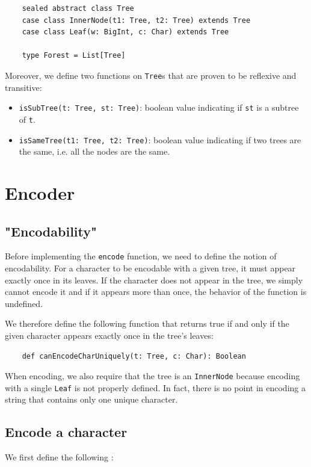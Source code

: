 \documentclass[a4paper,UKenglish,cleveref, autoref, thm-restate]{lipics-v2021}
\begin{document}
\begin{lstlisting}
    sealed abstract class Tree
    case class InnerNode(t1: Tree, t2: Tree) extends Tree
    case class Leaf(w: BigInt, c: Char) extends Tree
  
    type Forest = List[Tree]
\end{lstlisting}

Moreover, we define two functions on \lstinline{Tree}s that are proven to be reflexive and transitive:
\begin{itemize}
    \item \lstinline{isSubTree(t: Tree, st: Tree)}: boolean value indicating if \lstinline{st} is a subtree of \lstinline{t}.
    \item \lstinline{isSameTree(t1: Tree, t2: Tree)}: boolean value indicating if two trees are the same, i.e. all the nodes are the same.
\end{itemize}

\section{Encoder}

\subsection{"Encodability"}
Before implementing the \lstinline{encode} function, we need to define the notion of encodability. For a character to be encodable with a given tree, it must appear exactly once in its leaves.
If the character does not appear in the tree, we simply cannot encode it and if it appears more than once, the behavior of the function is undefined.

We therefore define the following function that returns true if and only if the given character appears exactly once in the tree's leaves:

\begin{lstlisting}
    def canEncodeCharUniquely(t: Tree, c: Char): Boolean
\end{lstlisting}

When encoding, we also require that the tree is an \lstinline{InnerNode} because encoding with a single \lstinline{Leaf} is not properly defined. In fact, there is no point in encoding a string that contains only one unique character.

\subsection{Encode a character}
We first define the following :
\end{document}
